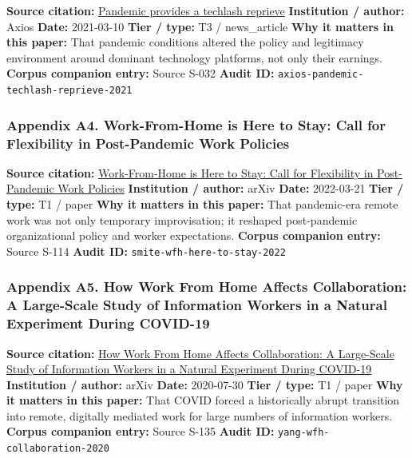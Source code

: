 \documentclass[
  american,
  11pt,
  letterpaper,
]{article}
\begin{document}
\textbf{Source citation:}
\href{https://www.axios.com/2021/03/10/pandemic-provides-techlash-reprieve}{Pandemic
provides a techlash reprieve} \textbf{Institution / author:} Axios
\textbf{Date:} 2021-03-10 \textbf{Tier / type:} T3 / news\_article
\textbf{Why it matters in this paper:} That pandemic conditions altered
the policy and legitimacy environment around dominant technology
platforms, not only their earnings. \textbf{Corpus companion entry:}
Source S-032 \textbf{Audit ID:}
\texttt{axios-pandemic-techlash-reprieve-2021}

\subsubsection{Appendix A4. Work-From-Home is Here to Stay: Call for
Flexibility in Post-Pandemic Work
Policies}\label{appendix-a4-work-from-home-is-here-to-stay-call-for-flexibility-in-post-pandemic-work-policies}

\textbf{Source citation:}
\href{https://arxiv.org/abs/2203.11136}{Work-From-Home is Here to Stay:
Call for Flexibility in Post-Pandemic Work Policies} \textbf{Institution
/ author:} arXiv \textbf{Date:} 2022-03-21 \textbf{Tier / type:} T1 /
paper \textbf{Why it matters in this paper:} That pandemic-era remote
work was not only temporary improvisation; it reshaped post-pandemic
organizational policy and worker expectations. \textbf{Corpus companion
entry:} Source S-114 \textbf{Audit ID:}
\texttt{smite-wfh-here-to-stay-2022}

\subsubsection{Appendix A5. How Work From Home Affects Collaboration: A
Large-Scale Study of Information Workers in a Natural Experiment During
COVID-19}\label{appendix-a5-how-work-from-home-affects-collaboration-a-large-scale-study-of-information-workers-in-a-natural-experiment-during-covid-19}

\textbf{Source citation:} \href{https://arxiv.org/abs/2007.15584}{How
Work From Home Affects Collaboration: A Large-Scale Study of Information
Workers in a Natural Experiment During COVID-19} \textbf{Institution /
author:} arXiv \textbf{Date:} 2020-07-30 \textbf{Tier / type:} T1 /
paper \textbf{Why it matters in this paper:} That COVID forced a
historically abrupt transition into remote, digitally mediated work for
large numbers of information workers. \textbf{Corpus companion entry:}
Source S-135 \textbf{Audit ID:} \texttt{yang-wfh-collaboration-2020}
\end{document}
